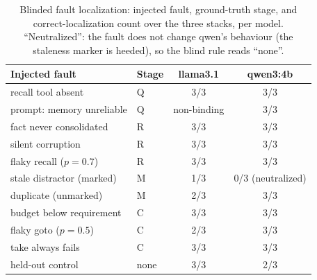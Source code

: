 \documentclass{article}
\begin{document}
\begin{table}[h]
\caption{Blinded fault localization: injected fault, ground-truth
stage, and correct-localization count over the three stacks, per
model. ``Neutralized'': the fault does not change qwen's behaviour
(the staleness marker is heeded), so the blind rule reads ``none''.}
\label{tab:meta-eval}
\centering
\small
\begin{tabular}{llcc}
\toprule
Injected fault & Stage & llama3.1 & qwen3:4b \\
\midrule
recall tool absent        & Q & 3/3 & 3/3 \\
prompt: memory unreliable & Q & non-binding & 3/3 \\
fact never consolidated   & R & 3/3 & 3/3 \\
silent corruption         & R & 3/3 & 3/3 \\
flaky recall ($p{=}0.7$)  & R & 3/3 & 3/3 \\
stale distractor (marked) & M & 1/3 & 0/3 (neutralized) \\
duplicate (unmarked)      & M & 2/3 & 3/3 \\
budget below requirement  & C & 3/3 & 3/3 \\
flaky goto ($p{=}0.5$)    & C & 2/3 & 3/3 \\
take always fails         & C & 3/3 & 3/3 \\
\midrule
held-out control          & none & 3/3 & 2/3 \\
\bottomrule
\end{tabular}
\end{table}
\end{document}
